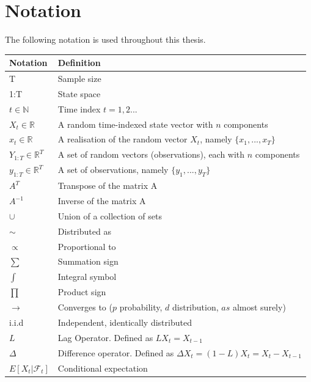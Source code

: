 \documentclass[11pt,a4,twosided,singlespacing,titlepagenumber=on]{scrreprt}
\numberwithin{equation}{chapter} %
\theoremstyle{remark}
\begin{document}

\chapter*{Notation}

The following notation is used throughout this thesis.
\begin{table}[h]
\centering
\begin{tabular}{ll}
\hline
\multicolumn{1}{|l|}{Notation}   	& \multicolumn{1}{l|}{Definition} \\ \hline
T									& Sample size \\
1:T									& State space \\
$t \in \mathbb{N}$ 					& Time index $t = {1,2...}$ \\
$X_t	\in \mathbb{R}$				& A random time-indexed state vector with $n$ components \\
$x_t	\in \mathbb{R}$				& A realisation of the random vector $X_t$, namely $\{x_1,...,x_T \}$ \\
$Y_{1:T} \in \mathbb{R}^T$  		& A set of random vectors (observations), each with $n$ components \\
$y_{1:T} \in \mathbb{R}^T$  		& A set of observations, namely $\{y_1,...,y_T \}$ \\
$A^T$								& Transpose of the matrix A \\
$A^{-1}$							& Inverse of the matrix A \\
$\cup$								& Union of a collection of sets \\
$\sim$								& Distributed as \\
$\propto$							& Proportional to \\
$\sum$								& Summation sign \\
$\int$								& Integral symbol \\
$\prod$								& Product sign \\
$\rightarrow$						& Converges to ($p$ probability, $d$ distribution, $as$ almost surely) \\
i.i.d								& Independent, identically distributed \\
$L$									& Lag Operator. Defined as $L X_t = X_{t-1}$ \\
$\Delta$							& Difference operator. Defined as $\Delta X_t = (1-L) X_t = X_t - X_{t-1}$ \\
$E[X_t | \mathcal{F}_t]$			& Conditional expectation \\

\end{tabular}
\end{table}
\end{document}
